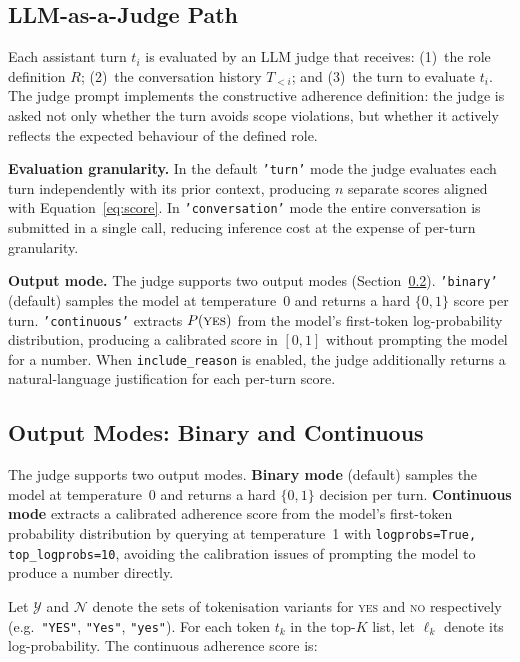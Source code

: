 \documentclass[11pt,a4paper]{article}
\begin{document}
\subsection{LLM-as-a-Judge Path}

Each assistant turn $t_i$ is evaluated by an LLM judge that receives:
(1)~the role definition $R$; (2)~the conversation history $T_{<i}$; and
(3)~the turn to evaluate $t_i$. The judge prompt implements the constructive
adherence definition: the judge is asked not only whether the turn avoids
scope violations, but whether it actively reflects the expected behaviour
of the defined role.

\textbf{Evaluation granularity.} In the default \texttt{'turn'} mode the
judge evaluates each turn independently with its prior context, producing
$n$ separate scores aligned with Equation~\ref{eq:score}. In
\texttt{'conversation'} mode the entire conversation is submitted in a
single call, reducing inference cost at the expense of per-turn granularity.

\textbf{Output mode.} The judge supports two output modes
(Section~\ref{sec:logprob}). \texttt{'binary'} (default) samples the model
at temperature~0 and returns a hard $\{0, 1\}$ score per turn.
\texttt{'continuous'} extracts $P(\textsc{yes})$ from the model's
first-token log-probability distribution, producing a calibrated score in
$[0, 1]$ without prompting the model for a number. When
\texttt{include\_reason} is enabled, the judge additionally returns a
natural-language justification for each per-turn score.

\subsection{Output Modes: Binary and Continuous}
\label{sec:logprob}

The judge supports two output modes. \textbf{Binary mode} (default) samples
the model at temperature~0 and returns a hard $\{0, 1\}$ decision per turn.
\textbf{Continuous mode} extracts a calibrated adherence score from the
model's first-token probability distribution by querying at temperature~1
with \texttt{logprobs=True, top\_logprobs=10}, avoiding the calibration
issues of prompting the model to produce a number directly.

Let $\mathcal{Y}$ and $\mathcal{N}$ denote the sets of tokenisation
variants for \textsc{yes} and \textsc{no} respectively
(e.g.\ \texttt{"YES"}, \texttt{"Yes"}, \texttt{"yes"}). For each token
$t_k$ in the top-$K$ list, let $\ell_k$ denote its log-probability. The
continuous adherence score is:
\end{document}
